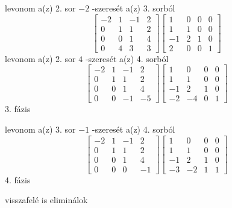\documentclass[12pt]{article}
\begin{document}
levonom a(z) 2. sor $-2$ -szeresét a(z) 3. sorból
$$\left[{\begin{array}{cccc}-2& 1& -1& 2\\ 0& 1& 1& 2\\ 0& 0& 1& 4\\ 0& 4& 3& 3\end{array}}\right]\left[{\begin{array}{cccc}1& 0& 0& 0\\ 1& 1& 0& 0\\ -1& 2& 1& 0\\ 2& 0& 0& 1\end{array}}\right]$$
levonom a(z) 2. sor $4$ -szeresét a(z) 4. sorból
$$\left[{\begin{array}{cccc}-2& 1& -1& 2\\ 0& 1& 1& 2\\ 0& 0& 1& 4\\ 0& 0& -1& -5\end{array}}\right]\left[{\begin{array}{cccc}1& 0& 0& 0\\ 1& 1& 0& 0\\ -1& 2& 1& 0\\ -2& -4& 0& 1\end{array}}\right]$$
3. fázis

levonom a(z) 3. sor $-1$ -szeresét a(z) 4. sorból
$$\left[{\begin{array}{cccc}-2& 1& -1& 2\\ 0& 1& 1& 2\\ 0& 0& 1& 4\\ 0& 0& 0& -1\end{array}}\right]\left[{\begin{array}{cccc}1& 0& 0& 0\\ 1& 1& 0& 0\\ -1& 2& 1& 0\\ -3& -2& 1& 1\end{array}}\right]$$
4. fázis

visszafelé is eliminálok
\end{document}
